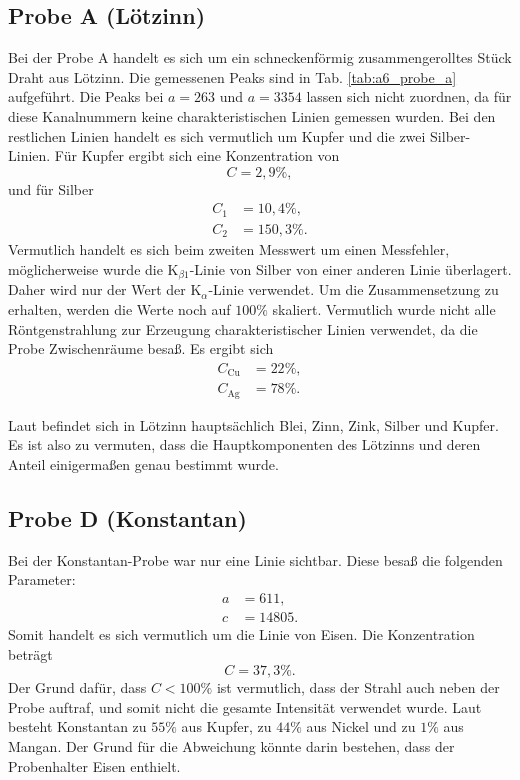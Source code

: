 \subsection{Probe A (Lötzinn)}

Bei der Probe A handelt es sich um ein schneckenförmig zusammengerolltes Stück Draht aus Lötzinn. Die gemessenen Peaks sind in Tab. \ref{tab:a6_probe_a} aufgeführt. Die Peaks bei $a=263$ und $a=3354$ lassen sich nicht zuordnen, da für diese Kanalnummern keine charakteristischen Linien gemessen wurden.
Bei den restlichen Linien handelt es sich vermutlich um Kupfer und die zwei Silber-Linien. Für Kupfer ergibt sich eine Konzentration von
\begin{equation}
 C = 2,9\%,
\end{equation}
und für Silber
\begin{align}
 C_{1} &= 10,4\%, \\
 C_{2} &= 150,3\%.
\end{align}
Vermutlich handelt es sich beim zweiten Messwert um einen Messfehler, möglicherweise wurde die K$_{\beta1}$-Linie von Silber von einer anderen Linie überlagert. Daher wird nur der Wert der K$_{\alpha}$-Linie verwendet.
Um die Zusammensetzung zu erhalten, werden die Werte noch auf $100\%$ skaliert. Vermutlich wurde nicht alle Röntgenstrahlung zur Erzeugung charakteristischer Linien verwendet, da die Probe Zwischenräume besaß.
Es ergibt sich
\begin{align}
 C_{\textrm{Cu}} &= 22\%, \\
 C_{\textrm{Ag}} &= 78\%.
\end{align}

Laut \cite{wiki_lot} befindet sich in Lötzinn hauptsächlich Blei, Zinn, Zink, Silber und Kupfer. Es ist also zu vermuten, dass die Hauptkomponenten des Lötzinns und deren Anteil einigermaßen genau bestimmt wurde.


\subsection{Probe D (Konstantan)}

Bei der Konstantan-Probe war nur eine Linie sichtbar. Diese besaß die folgenden Parameter:
\begin{align}
 a &= 611, \\
 c &= 14805. 
\end{align}
Somit handelt es sich vermutlich um die Linie von Eisen. Die Konzentration beträgt
\begin{equation}
 C = 37,3\%. 
\end{equation}
Der Grund dafür, dass $C<100\%$ ist vermutlich, dass der Strahl auch neben der Probe auftraf, und somit nicht die gesamte Intensität verwendet wurde. Laut \cite{wiki_konst} besteht Konstantan zu $55\%$ aus Kupfer, zu $44\%$ aus Nickel und zu $1\%$ aus Mangan.
Der Grund für die Abweichung könnte darin bestehen, dass der Probenhalter Eisen enthielt.

